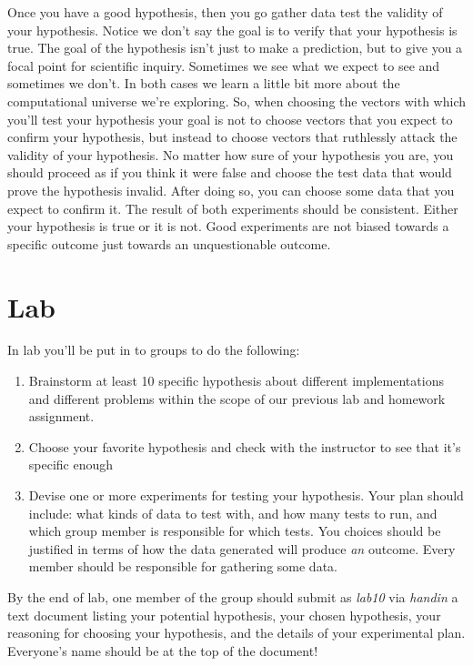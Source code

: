 \documentclass[]{tufte-handout}
\begin{document}
Once you have a good hypothesis, then you go gather data test the validity of your hypothesis.  Notice we don't say the goal is to verify that your hypothesis is true. The goal of the hypothesis isn't just to make a prediction, but to give you a focal point for scientific inquiry. Sometimes we see what we expect to see and sometimes we don't. In both cases we learn a little bit more about the computational universe we're exploring. So, when choosing the vectors with which you'll test your hypothesis your goal is not to choose vectors that you expect to confirm your hypothesis, but instead to choose vectors that ruthlessly attack the validity of your hypothesis. No matter how sure of your hypothesis you are, you should proceed as if you think it were false and choose the test data that would prove the hypothesis invalid. After doing so, you can choose some data that you expect to confirm it.  The result of both experiments should be consistent. Either your hypothesis is true or it is not.  Good experiments are not biased towards a specific outcome just towards an unquestionable outcome. 

\section{Lab}

In lab you'll be put in to groups to do the following:
\begin{enumerate}
\item Brainstorm at least 10 specific hypothesis about different implementations and different problems within the scope of our previous lab and homework assignment. 
\item Choose your favorite hypothesis and check with the instructor to see that it's specific enough
\item Devise one or more experiments for testing your hypothesis. Your plan should include: what kinds of data to test with, and how many tests to run, and which group member is responsible for which tests.  You choices should be justified in terms of how the data generated will produce \textit{an} outcome. Every member should be responsible for gathering some data.
\end{enumerate}

By the end of lab, one member of the group should submit as \textit{lab10} via \textit{handin} a text document listing your potential hypothesis, your chosen hypothesis, your reasoning for choosing your hypothesis, and the details of your experimental plan. Everyone's name should be at the top of the document!
\end{document}

